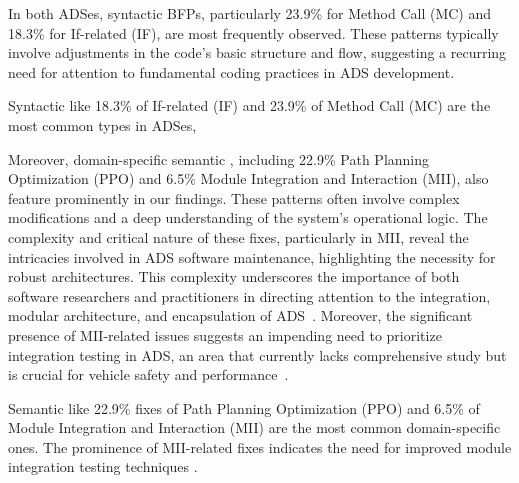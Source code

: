 In both ADSes, syntactic BFPs, particularly 23.9\% for Method Call (MC) and 18.3\% for If-related (IF), are most frequently observed. 
These patterns typically involve adjustments in the code's basic structure and flow, suggesting a recurring need for attention to fundamental coding practices in ADS development.


\vspace{-1ex}
\begin{finding}
\label{finding:rq1_if_mc}
    Syntactic \bfps like 18.3\% of If-related (IF) and 23.9\% of Method Call (MC) are the most common types in ADSes, 
\end{finding}
\vspace{-1ex}

Moreover, domain-specific semantic \bfps, including 22.9\% Path Planning Optimization (PPO) and 6.5\% Module Integration and Interaction (MII), also feature prominently in our findings. These patterns often involve complex modifications and a deep understanding of the system’s operational logic. 
The complexity and critical nature of these fixes, particularly in MII, reveal the intricacies involved in ADS software maintenance, highlighting the necessity for robust architectures. This complexity underscores the importance of both software researchers and practitioners in directing attention to the integration, modular architecture, and encapsulation of ADS~\cite{TasKZS16,0003LPZ0SG18}. Moreover, the significant presence of MII-related issues suggests an impending need to prioritize integration testing in ADS, an area that currently lacks comprehensive study but is crucial for vehicle safety and performance~\cite{LouDZZ022}.

\vspace{-1ex}
\begin{finding}
\label{finding:rq1_ppo_mii}
    Semantic \bfps like 22.9\% fixes of Path Planning Optimization (PPO) and 6.5\% of Module Integration and Interaction (MII) are the most common domain-specific ones. The prominence of MII-related fixes indicates the need for improved module integration testing techniques .
\end{finding}
\vspace{-1ex}

